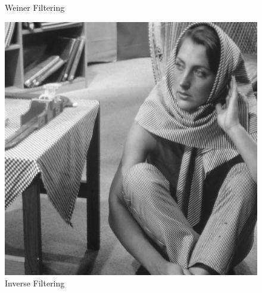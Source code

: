 \documentclass{article}
\begin{document}
\begin{figure}[!htb]
      \caption{Weiner Filtering}
    \endminipage\hfill
      \includegraphics[scale=.28]{./deblurring/0/inverse.png}
      \caption{Inverse Filtering}
    \endminipage
    \end{figure}
    \\[5pt]
\end{document}
